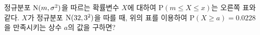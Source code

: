 \noindent\begin{minipage}[t]{0.58\linewidth}\vspace{0pt}\raggedright 정규분포 $\mathrm{N}(m{,}\mkern3mu\mathopen{}\sigma^2)$을 따르는 확률변수 $X$에 대하여 $\mathrm{P}(m\le X\le x)$는 오른쪽 표와 같다. $X$가 정규분포 $\mathrm{N}(32{,}\mkern3mu\mathopen{}3^2)$을 따를 때, 위의 표를 이용하여 $\mathrm{P}(X\ge a)=0.0228$을 만족시키는 상수 $a$의 값을 구하면?\end{minipage}\hfill\begin{minipage}[t]{0.4\linewidth}\vspace{0pt}\centering \resizebox{\ifdim\width>\linewidth\linewidth\else\width\fi}{!}{}\end{minipage}\par
{}
